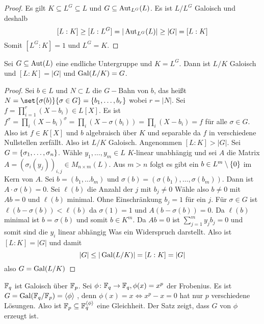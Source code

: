 \begin{proof}
    Es gilt $K\subseteq L^G\subseteq L$ und $G\subseteq\operatorname{Aut}_{L^G}(L)$. Es ist $L/L^G$ Galoisch und deshalb
    $$[L:K]\geq [L:L^G]=|\operatorname{Aut}_{L^G}(L)|\geq |G|=[L:K]$$
    Somit $[L^G:K]=1$ und $L^G=K$.
\end{proof}
\begin{Satz}\label{Satz:Galois2}
    Sei $G\subseteq \operatorname{Aut}(L)$ eine endliche Untergruppe und $K=L^G$. Dann ist $L/K$ Galoisch und $[L:K]=|G|$ und $\operatorname{Gal}(L/K)=G$.
\end{Satz}
\begin{proof}
    Sei $b\in L$ und $N\subset L$ die $G-$Bahn von $b$, das heißt $N=\set{\sigma(b)}{ \sigma\in G}=\{b_1,\dots,b_r\}$ wobei $r=|N|$. Sei $f=\prod_{i=1}^r(X-b_i)\in L[X]$.
    Es ist $f^\sigma=\prod_i(X-b_i)^\sigma=\prod_i(X-\sigma(b_i))=\prod_i(X-b_i)=f$ für alle $\sigma\in G$. Also ist $f\in K[X]$ und $b$ algebraisch über $K$ und separable da $f$ in verschiedene Nullstellen zerfällt.
    Also ist $L/K$ Galoisch.
    Angenommen $[L:K]>|G|$. Sei $G=\{\sigma_1,\dots,\sigma_n\}$. Wähle $y_1,\dots,y_m\in L$ $K$-linear unabhängig und sei $A$ die Matrix $A=(\sigma_i(y_j))_{i,j}\in M_{n\times m}(L)$.
    Aus $m>n$ folgt es gibt ein $b\in L^m\setminus\{0\}$ im Kern von $A$.
    Sei $b=(b_1,\dots b_m)$ und $\sigma(b)=(\sigma(b_1),\dots,\sigma(b_m))$.
    Dann ist $A\cdot \sigma(b)=0$.
    Sei $\ell(b)$ die Anzahl der $j$ mit $b_j\neq 0$ Wähle also $b\neq 0$ mit $Ab=0$ und $\ell(b)$ minimal. Ohne Einschränkung $b_j=1$ für ein $j$.
    Für $\sigma\in G$ ist $\ell(b-\sigma(b))<\ell(b)$ da $\sigma(1)=1$ und $A(b-\sigma(b))=0$. Da $\ell(b)$ minimal ist $b=\sigma(b)$ und somit $b\in K^m$.
    Da $Ab=0$ ist $\sum_{j=1}^my_jb_j=0$ und somit sind die $y_i$ linear abhängig Was ein Widerspruch darstellt.
    Also ist $[L:K]=|G|$ und damit 
    $$|G|\leq |\operatorname{Gal}(L/K)|=[L:K]=|G|$$ also $G=\operatorname{Gal}(L/K)$
\end{proof}
\begin{Bsp}
    $\mathbb{F}_q$ ist Galoisch über $\mathbb{F}_p$. Sei $\phi\colon \mathbb{F}_q\to \mathbb{F}_q, \phi(x)=x^p$ der Frobenius. Es ist $G=\operatorname{Gal}(\mathbb{F}_q/\mathbb{F}_p)=\langle\phi\rangle$
, denn $\phi(x)=x\iff x^p-x=0$ hat nur $p$ verschiedene Lösungen. Also ist $\mathbb{F}_p\subseteq \mathbb{F}_q^{\langle\phi\rangle}$ eine Gleichheit. Der Satz zeigt, dass $G$ von $\phi$ erzeugt ist.
\end{Bsp}
